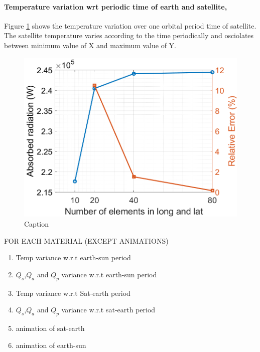 \documentclass[11pt]{article}
\begin{document}
\paragraph{Temperature variation wrt periodic time of earth and satellite,}
Figure \ref{fig:temp} shows the temperature variation over one orbital period time of satellite. The satellite temperature varies according to the time periodically and osciolates between minimum value of X and maximum value of Y.  

\begin{figure}
    \centering
    \includegraphics{Matlab/Sensitivity/fig_Q_sensitivity_0_180.png}
    \caption{Caption}
    \label{fig:temp}
\end{figure}







 
FOR EACH MATERIAL (EXCEPT ANIMATIONS)
\begin{enumerate}
    \item Temp variance w.r.t earth-sun period
    \item $Q_{s}$,$Q_{a}$ and $Q_{p}$ variance w.r.t earth-sun period
    \item Temp variance w.r.t Sat-earth period
    \item $Q_{s}$,$Q_{a}$ and $Q_{p}$ variance w.r.t sat-earth period
    \item animation of sat-earth
    \item animation of earth-sun 


\end{enumerate}
\end{document}
